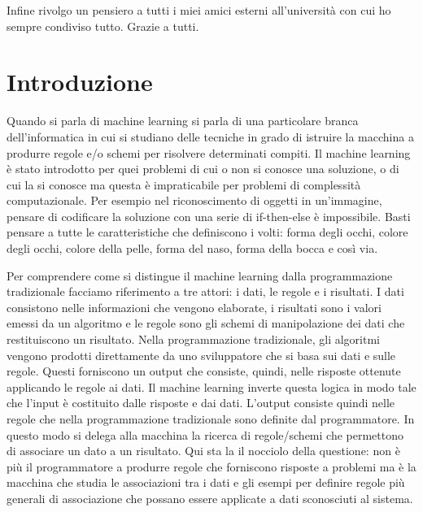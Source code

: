 \documentclass[12pt,italian]{report}
\begin{document}
\bigskip

\noindent Infine rivolgo un pensiero a tutti i miei amici esterni all'università con cui ho sempre condiviso tutto. Grazie a tutti.

%
%

\afterpreface

% 
% 

\chapter*{Introduzione}
Quando si parla di machine learning si parla di una particolare branca dell'informatica in cui si studiano delle tecniche in grado di istruire la macchina a produrre regole e/o schemi per risolvere determinati compiti. Il machine learning è stato introdotto per quei problemi di cui o non si conosce una soluzione, o di cui la si conosce ma questa è impraticabile per problemi di complessità computazionale.
Per esempio nel riconoscimento di oggetti in un'immagine, pensare di codificare la soluzione con una serie di if-then-else è impossibile. Basti pensare a tutte le caratteristiche che definiscono i volti: forma degli occhi, colore degli occhi, colore della pelle, forma del naso, forma della bocca e così via. 

Per comprendere come si distingue il machine learning dalla programmazione tradizionale facciamo riferimento a tre attori: i dati, le regole e i risultati. I dati consistono nelle informazioni che vengono elaborate, i risultati sono i valori emessi da un algoritmo e le regole sono gli schemi di manipolazione dei dati che restituiscono un risultato.
Nella programmazione tradizionale, gli algoritmi vengono prodotti direttamente da uno sviluppatore che si basa sui dati e sulle regole. Questi forniscono un output che consiste, quindi, nelle risposte ottenute applicando le regole ai dati. Il machine learning inverte questa logica in modo tale che l'input è costituito dalle risposte e dai dati. L'output consiste quindi nelle regole che nella programmazione tradizionale sono definite dal programmatore. In questo modo si delega alla macchina la ricerca di regole/schemi che permettono di associare un dato a un risultato. Qui sta la il nocciolo della questione: non è più il programmatore a produrre regole che forniscono risposte a problemi ma è la macchina che studia le associazioni tra i dati e gli esempi per definire regole più generali di associazione che possano essere applicate a dati sconosciuti al sistema.
\end{document}
